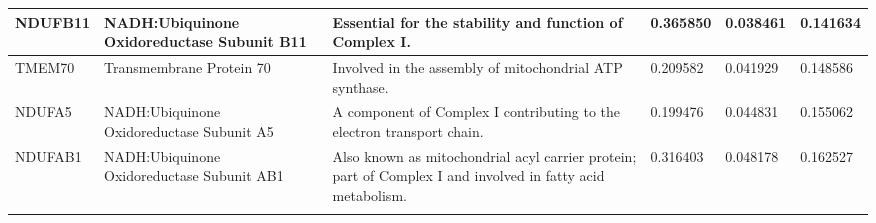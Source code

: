 \begin{longtable}{p{1.5cm} p{4cm} p{5cm} p{1.5cm} p{1.5cm} p{1.5cm}}
    \hline
    NDUFB11 & NADH:Ubiquinone Oxidoreductase Subunit B11 & Essential for the stability and function of Complex I. & 0.365850 & 0.038461 & 0.141634 \\
    \hline
    TMEM70 & Transmembrane Protein 70 & Involved in the assembly of mitochondrial ATP synthase. & 0.209582 & 0.041929 & 0.148586 \\
    \hline
    NDUFA5 & NADH:Ubiquinone Oxidoreductase Subunit A5 & A component of Complex I contributing to the electron transport chain. & 0.199476 & 0.044831 & 0.155062 \\
    \hline
    NDUFAB1 & NADH:Ubiquinone Oxidoreductase Subunit AB1 & Also known as mitochondrial acyl carrier protein; part of Complex I and involved in fatty acid metabolism. & 0.316403 & 0.048178 & 0.162527 \\
    \label{tab:cluster0_genes_y622}
\end{longtable}

